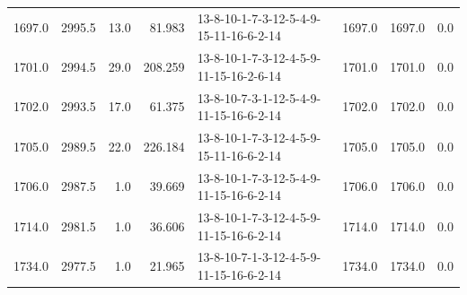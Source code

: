 \begin{tabular}{rrrrlrrr}
 1697.0 &  2995.5 &           13.0 &             81.983 &  13-8-10-1-7-3-12-5-4-9-15-11-16-6-2-14 &        1697.0 &          1697.0 &       0.0 \\
 1701.0 &  2994.5 &           29.0 &            208.259 &  13-8-10-1-7-3-12-4-5-9-11-15-16-2-6-14 &        1701.0 &          1701.0 &       0.0 \\
 1702.0 &  2993.5 &           17.0 &             61.375 &  13-8-10-7-3-1-12-5-4-9-11-15-16-6-2-14 &        1702.0 &          1702.0 &       0.0 \\
 1705.0 &  2989.5 &           22.0 &            226.184 &  13-8-10-1-7-3-12-4-5-9-15-11-16-6-2-14 &        1705.0 &          1705.0 &       0.0 \\
 1706.0 &  2987.5 &            1.0 &             39.669 &  13-8-10-1-7-3-12-5-4-9-11-15-16-6-2-14 &        1706.0 &          1706.0 &       0.0 \\
 1714.0 &  2981.5 &            1.0 &             36.606 &  13-8-10-1-7-3-12-4-5-9-11-15-16-6-2-14 &        1714.0 &          1714.0 &       0.0 \\
 1734.0 &  2977.5 &            1.0 &             21.965 &  13-8-10-7-1-3-12-4-5-9-11-15-16-6-2-14 &        1734.0 &          1734.0 &       0.0 \\
\bottomrule
\end{tabular}
